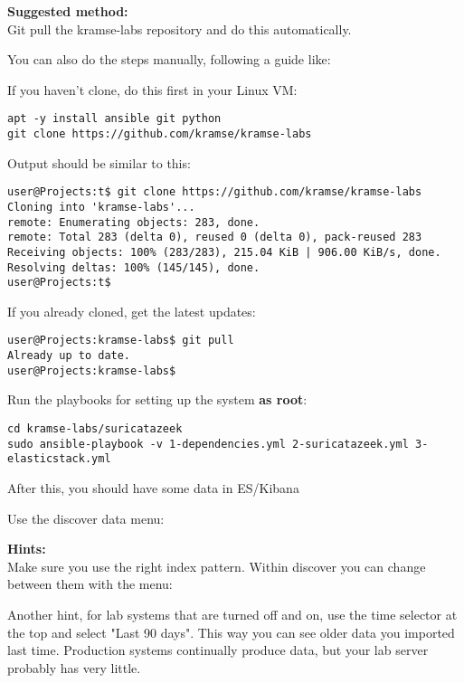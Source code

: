 \documentclass[a4paper,11pt,notitlepage]{report}
\begin{document}
{\bf Suggested method:}\\
Git pull the kramse-labs repository and do this automatically.

You can also do the steps manually, following a guide like:\\


If you haven't clone, do this first in your Linux VM:
\begin{verbatim}
apt -y install ansible git python
git clone https://github.com/kramse/kramse-labs
\end{verbatim}

Output should be similar to this:
\begin{verbatim}
user@Projects:t$ git clone https://github.com/kramse/kramse-labs
Cloning into 'kramse-labs'...
remote: Enumerating objects: 283, done.
remote: Total 283 (delta 0), reused 0 (delta 0), pack-reused 283
Receiving objects: 100% (283/283), 215.04 KiB | 906.00 KiB/s, done.
Resolving deltas: 100% (145/145), done.
user@Projects:t$
\end{verbatim}

If you already cloned, get the latest updates:
\begin{verbatim}
user@Projects:kramse-labs$ git pull
Already up to date.
user@Projects:kramse-labs$
\end{verbatim}

Run the playbooks for setting up the system {\bf as root}:
\begin{verbatim}
cd kramse-labs/suricatazeek
sudo ansible-playbook -v 1-dependencies.yml 2-suricatazeek.yml 3-elasticstack.yml
\end{verbatim}

After this, you should have some data in ES/Kibana

Use the discover data menu:


{\bf Hints:}\\
Make sure you use the right index pattern. Within discover you can change between them with the menu:


Another hint, for lab systems that are turned off and on, use the time selector at the top and select "Last 90 days". This way you can see older data you imported last time. Production systems continually produce data, but your lab server probably has very little.
\end{document}

